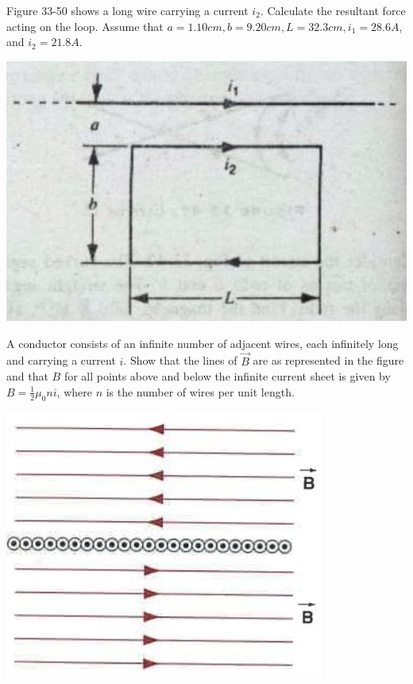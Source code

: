 \documentclass[11pt,letterpaper,boxed]{hmcpset}
\begin{document}
	\begin{problem}[HRK E33.24] Figure 33-50 shows a long wire carrying a current $i_2$. Calculate the resultant force acting on the loop. Assume that $a = 1.10 cm, b = 9.20 cm, L = 32.3 cm, i_1 = 28.6 A$, and $i_2 = 21.8A$.
				\begin{center}
		\includegraphics[scale=.6]{51m8pic4.jpg}
		\end{center}
	\end{problem}
	
	\begin{solution}
		\vfill
	\end{solution}
	\newpage
	
	\begin{problem}A conductor consists of an infinite number of adjacent wires, each infinitely long and carrying a current $i$. Show that the lines of $\vec{B}$ are as represented in the figure and that $B$ for all points above and below the infinite current sheet is given by $B = \frac{1}{2} \mu_0 ni$, where $n$ is the number of wires per unit length.
	\begin{center}
\includegraphics[scale=.5]{51m8pic5.jpg}
\end{center}		
	\end{problem}
	
\end{document}
